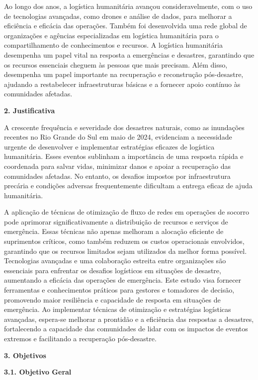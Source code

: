 \documentclass[
]{article}
\begin{document}
Ao longo dos anos, a logística humanitária avançou consideravelmente,
com o uso de tecnologias avançadas, como drones e análise de dados, para
melhorar a eficiência e eficácia das operações. Também foi desenvolvida
uma rede global de organizações e agências especializadas em logística
humanitária para o compartilhamento de conhecimentos e recursos. A
logística humanitária desempenha um papel vital na resposta a
emergências e desastres, garantindo que os recursos essenciais cheguem
às pessoas que mais precisam. Além disso, desempenha um papel importante
na recuperação e reconstrução pós-desastre, ajudando a restabelecer
infraestruturas básicas e a fornecer apoio contínuo às comunidades
afetadas.

\textbf{2. Justificativa}

A crescente frequência e severidade dos desastres naturais, como as
inundações recentes no Rio Grande do Sul em maio de 2024, evidenciam a
necessidade urgente de desenvolver e implementar estratégias eficazes de
logística humanitária. Esses eventos sublinham a importância de uma
resposta rápida e coordenada para salvar vidas, minimizar danos e apoiar
a recuperação das comunidades afetadas. No entanto, os desafios impostos
por infraestrutura precária e condições adversas frequentemente
dificultam a entrega eficaz de ajuda humanitária.

A aplicação de técnicas de otimização de fluxo de redes em operações de
socorro pode aprimorar significativamente a distribuição de recursos e
serviços de emergência. Essas técnicas não apenas melhoram a alocação
eficiente de suprimentos críticos, como também reduzem os custos
operacionais envolvidos, garantindo que os recursos limitados sejam
utilizados da melhor forma possível. Tecnologias avançadas e uma
colaboração estreita entre organizações são essenciais para enfrentar os
desafios logísticos em situações de desastre, aumentando a eficácia das
operações de emergência. Este estudo visa fornecer ferramentas e
conhecimentos práticos para gestores e tomadores de decisão, promovendo
maior resiliência e capacidade de resposta em situações de emergência.
Ao implementar técnicas de otimização e estratégias logísticas
avançadas, espera-se melhorar a prontidão e a eficiência das respostas a
desastres, fortalecendo a capacidade das comunidades de lidar com os
impactos de eventos extremos e facilitando a recuperação pós-desastre.

\textbf{3. Objetivos}

\textbf{3.1. Objetivo Geral}
\end{document}
